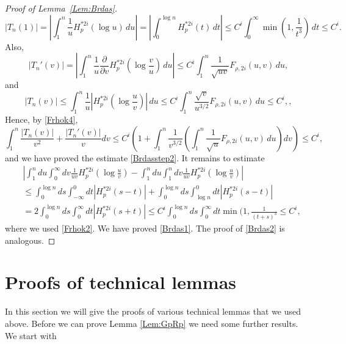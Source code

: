 \documentclass{article}
\numberwithin{equation}{section}
\numberwithin{figure}{section}
\theoremstyle{plain}
\theoremstyle{plain}
\numberwithin{thm}{section}
\theoremstyle{remark}
\let \le \leqslant
\begin{document}
\begin{proof}[Proof of Lemma~\ref{Lem:Brdas}]
\begin{equation*}
   |T_n(1)|=\left|\int_1^n\frac 1uH_p^{*2i}(\log u)\,du\right|=\left|\int_0^{\log n}H_p^{*2i}(t)\,dt\right|\le C^i\int_0^\infty\min(1,\frac 1{t^3})\,dt\le C^i.
\end{equation*}
Also,
\begin{equation*}
 |T_n'(v)|=\left|\int_1^n\frac 1u\frac{\partial}{\partial v}H_p^{*2i}(\log\frac vu)\,du\right|\le C^i\int_1^n\frac 1{\sqrt{uv}}F_{\rho,2i}(u,v)\,du,   
\end{equation*}
and
\begin{equation*}
 |T_n(v)|\le\int_1^n\frac 1u|H_p^{*2i}(\log\frac uv)|\,du\le C^i\int_1^n\frac {\sqrt{v}}{u^{3/2}}F_{\rho,2i}(u,v)\,du\le C^i,,   
\end{equation*}
Hence, by \eqref{Frhok4},
\begin{equation*}
 \int_1^n\frac{|T_n(v)|}{v^2}+\frac{|T_n'(v)|}{v}dv\le C^i\left(1+\int_1^n\frac 1{v^{3/2}}\left(\int_1^n\frac 1{\sqrt{u}}F_{\rho,2i}(u,v)\,du\right)dv\right)\le C^i,  
\end{equation*}
and we have proved the estimate \eqref{Brdasstep2}. It remains to estimate 
\begin{align*}
    &\left|\int_1^ndu\int_0^\infty dv \frac 1{uv}H_p^{*2i}(\log\frac uv)-\int_1^ndu\int_1^n dv \frac 1{uv}H_p^{*2i}(\log\frac uv)\right|\\
    &\le \int_0^{\log n}ds\int_{-\infty}^0dt|H_p^{*2i}(s-t)|+
    \int_0^{\log n}ds\int_{\log n}^0dt|H_p^{*2i}(s-t)|\\
    &=2\int_0^{\log n}ds\int_{0}^\infty dt|H_p^{*2i}(s+t)|\le C^i\int_0^{\log n}ds\int_{0}^\infty dt\min(1,\frac 1{(t+s)^3}\le C^i,
\end{align*}
where we used \eqref{Frhok2}. We have proved \eqref{Brdas1}. The proof of \eqref{Brdas2} is analogous.
\end{proof}


\section{Proofs of technical lemmas}\label{Sec:lemmas}
In this section we will give the proofs of various technical lemmas that we used above. Before we can prove Lemma \ref{Lem:GpRp} we need some further
results. We start with
\end{document}
